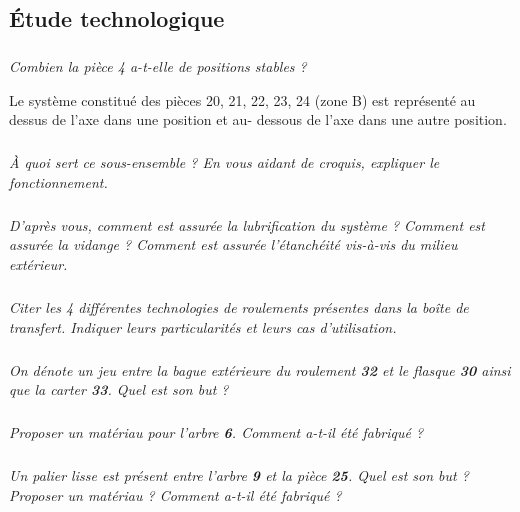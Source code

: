\documentclass[10pt]{article}
\begin{document}
\subsection{Étude technologique}
\subparagraph{}
\textit{Combien la pièce 4 a-t-elle de positions stables ?}

\vspace{.25cm}

Le système constitué des pièces 20, 21, 22, 23, 24 (zone B) est représenté au dessus de l’axe dans une position et au- dessous de l’axe dans une autre position.

\subparagraph{}
\textit{À quoi sert ce sous-ensemble ? En vous aidant de croquis, expliquer le fonctionnement.}



\subparagraph{}
\textit{D'après vous, comment est assurée la lubrification du système ? Comment est assurée la vidange ? Comment est assurée l'étanchéité vis-à-vis du milieu extérieur. }

\subparagraph{}
\textit{Citer les 4 différentes technologies de roulements présentes dans la boîte de transfert. Indiquer leurs particularités et leurs cas d'utilisation.}

\subparagraph{}
\textit{On dénote un jeu entre la bague extérieure du roulement \textbf{32} et le flasque \textbf{30} ainsi que la carter \textbf{33}. Quel est son but ?}

\subparagraph{}
\textit{Proposer un matériau pour l'arbre \textbf{6}. Comment a-t-il été fabriqué ?}
%
%
%
%
%

\subparagraph{}
\textit{Un palier lisse est présent entre l'arbre \textbf{9} et la pièce \textbf{25}. Quel est son but ? Proposer un matériau ? Comment a-t-il été fabriqué ?}
\end{document}
